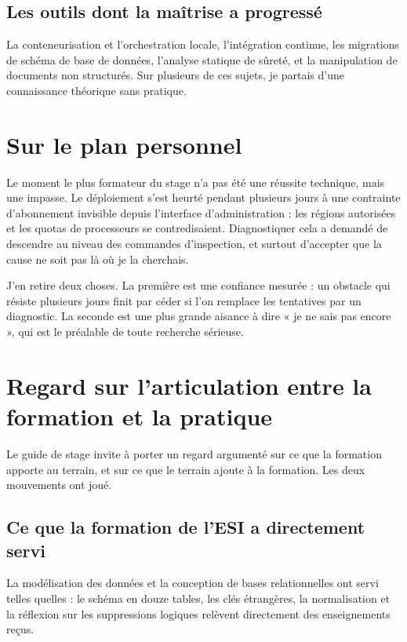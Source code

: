 \documentclass[12pt,a4paper]{report}
\begin{document}
\subsection{Les outils dont la maîtrise a progressé}

La conteneurisation et l'orchestration locale, l'intégration continue, les
migrations de schéma de base de données, l'analyse statique de sûreté, et la
manipulation de documents non structurés. Sur plusieurs de ces sujets, je
partais d'une connaissance théorique sans pratique.

\section{Sur le plan personnel}

Le moment le plus formateur du stage n'a pas été une réussite technique, mais
une impasse. Le déploiement s'est heurté pendant plusieurs jours à une
contrainte d'abonnement invisible depuis l'interface d'administration : les
régions autorisées et les quotas de processeurs se contredisaient. Diagnostiquer
cela a demandé de descendre au niveau des commandes d'inspection, et surtout
d'accepter que la cause ne soit pas là où je la cherchais.

J'en retire deux choses. La première est une confiance mesurée : un obstacle
qui résiste plusieurs jours finit par céder si l'on remplace les tentatives par
un diagnostic. La seconde est une plus grande aisance à dire « je ne sais pas
encore », qui est le préalable de toute recherche sérieuse.

\section{Regard sur l'articulation entre la formation et la pratique}

Le guide de stage invite à porter un regard argumenté sur ce que la formation
apporte au terrain, et sur ce que le terrain ajoute à la formation. Les deux
mouvements ont joué.

\subsection{Ce que la formation de l'ESI a directement servi}

La modélisation des données et la conception de bases relationnelles ont servi
telles quelles : le schéma en douze tables, les clés étrangères, la
normalisation et la réflexion sur les suppressions logiques relèvent
directement des enseignements reçus.
\end{document}
